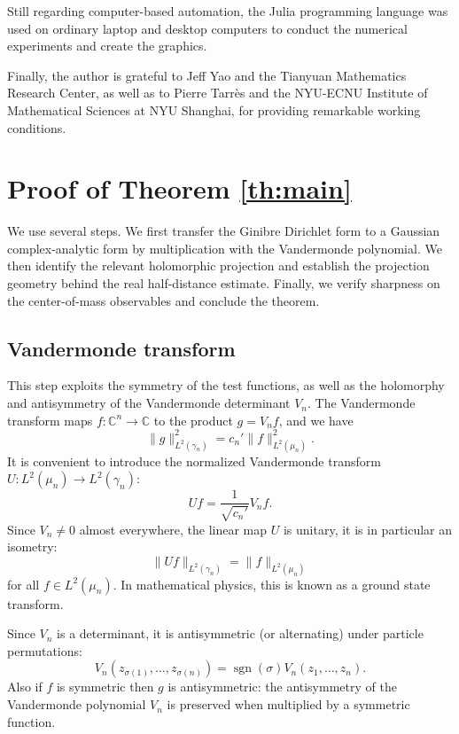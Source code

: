 \documentclass[11pt,reqno]{amsart}
\numberwithin{equation}{section}%
\numberwithin{figure}{section}%
\numberwithin{table}{section}
\theoremstyle{plain}
\theoremstyle{definition}
\begin{document}
Still regarding computer-based automation, the Julia programming language was
used on ordinary laptop and desktop computers to conduct the numerical
experiments and create the graphics.

Finally, the author is grateful to Jeff Yao and the Tianyuan Mathematics
Research Center, as well as to Pierre Tarrès and the NYU-ECNU Institute of
Mathematical Sciences at NYU Shanghai, for providing remarkable working
conditions.

\section{Proof of Theorem \ref{th:main}}
\label{se:proof:th:main}

We use several steps. We first transfer the Ginibre Dirichlet form to a
Gaussian complex-analytic form by multiplication with the Vandermonde
polynomial. We then identify the relevant holomorphic projection and establish
the projection geometry behind the real half-distance estimate. Finally, we
verify sharpness on the center-of-mass observables and conclude the theorem.

\subsection{Vandermonde transform}

This step exploits the symmetry of the test functions, as well as the
holomorphy and antisymmetry of the Vandermonde determinant $V_n$. The
Vandermonde transform maps $f:\mathbb{C}^n\to\mathbb{C}$ to the product
$g=V_nf$, and we have
\begin{equation}\label{eq:vand-isometry}
  \|g\|_{L^2(\gamma_n)}^2=c_n'\|f\|_{L^2(\mu_n)}^2.
\end{equation}
It is convenient to introduce the normalized Vandermonde transform
$U:L^2(\mu_n)\to L^2(\gamma_n)$:
\begin{equation}\label{eq:U}
  Uf=\frac{1}{\sqrt{c_n'}}V_nf.
\end{equation}
Since $V_n\neq0$ almost everywhere, the linear map $U$ is unitary, it is in
particular an isometry: 
\begin{equation}
  \|Uf\|_{L^2(\gamma_n)}=\|f\|_{L^2(\mu_n)}
\end{equation}
for all $f\in L^2(\mu_n)$. In mathematical physics, this is known as a ground
state transform.

Since $V_n$ is a determinant, it is antisymmetric (or alternating) under
particle permutations:
\begin{equation}\label{eq:vand-alternating}
  V_n(z_{\sigma(1)},\ldots,z_{\sigma(n)})=\operatorname{sgn}(\sigma)V_n(z_1,\ldots,z_n).
\end{equation}
Also if $f$ is symmetric then $g$ is antisymmetric: the antisymmetry of the
Vandermonde polynomial $V_n$ is preserved when multiplied by a symmetric
function.
\end{document}
